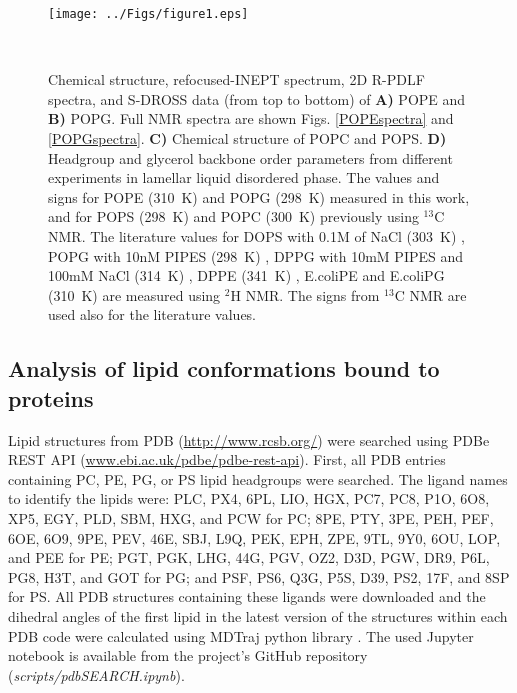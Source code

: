 \documentclass[aps,prl,superscriptaddress,twocolumn]{revtex4}
\begin{document}
\begin{figure*}[]
  \centering
   \texttt{[image: ../Figs/figure1.eps]}
   \caption{\label{HGorderParameters}
     Chemical structure, refocused-INEPT spectrum, 2D R-PDLF spectra, and S-DROSS data (from top to bottom) of {\bf A)} POPE  and {\bf B)} POPG.
      Full NMR spectra are shown Figs. \ref{POPEspectra} and \ref{POPGspectra}.
     {\bf C)} Chemical structure of POPC and POPS.
    {\bf D)} Headgroup and glycerol backbone order parameters from different experiments in lamellar liquid disordered phase.
    The values and signs for POPE (310~K) and POPG (298~K)
    measured in this work, and for POPS (298~K) \cite{antila19} and POPC (300~K) \cite{ferreira13,ferreira16}
    previously using $^{13}$C NMR. The literature values for
    DOPS with 0.1M of NaCl (303~K) \cite{browning80},
    POPG with 10nM PIPES (298~K) \cite{borle85},
    DPPG with 10mM PIPES and 100mM NaCl (314~K) \cite{wohlgemuth80}, 
    DPPE (341~K) \cite{seelig76},
    E.coliPE and E.coliPG (310~K) \cite{gally81}
    are measured using $^2$H NMR. The signs from $^{13}$C NMR are used also for the literature values.
   }
    \\
\end{figure*}


\subsection{Analysis of lipid conformations bound to proteins}
Lipid structures from PDB (\url{http://www.rcsb.org/})
were searched using PDBe REST API (\url{www.ebi.ac.uk/pdbe/pdbe-rest-api}).
First, all PDB entries containing PC, PE, PG, or PS lipid headgroups were searched.
The ligand names to identify the lipids were:
PLC, PX4, 6PL, LIO, HGX, PC7, PC8, P1O, 6O8, XP5, EGY, PLD, SBM, HXG, and PCW for PC;
8PE, PTY, 3PE, PEH, PEF, 6OE, 6O9, 9PE, PEV, 46E, SBJ, L9Q, PEK, EPH, ZPE, 9TL, 9Y0, 6OU, LOP, and PEE for PE;
PGT, PGK, LHG, 44G, PGV, OZ2, D3D, PGW, DR9, P6L, PG8, H3T, and GOT for PG; and
PSF, PS6, Q3G, P5S, D39, PS2, 17F, and 8SP for PS.
All PDB structures containing these ligands were downloaded and the dihedral angles of
the first lipid in the latest version of the structures within each PDB code were calculated  
using MDTraj python library \cite{mcgibbon15}.
The used Jupyter notebook is available from the project's GitHub repository ({\it scripts/pdbSEARCH.ipynb}).
\end{document}
